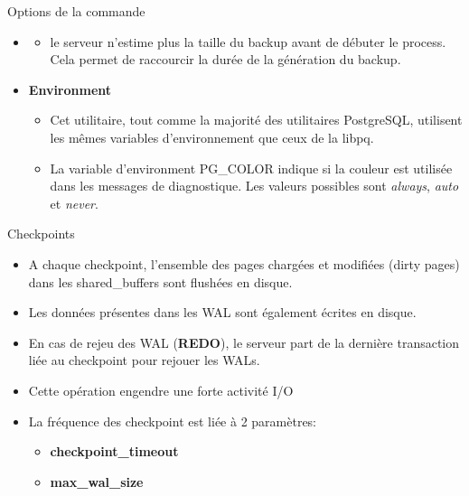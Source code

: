 \begin{frame}{Options de la commande }

\begin{itemize}
   \item {}
   \begin{itemize}
      \item le serveur n'estime plus la taille du backup avant de débuter le process. Cela permet de raccourcir la durée de la génération du backup.
   \end{itemize}

\item{\textbf{Environment}}
   \begin{itemize}
      \item Cet utilitaire, tout comme la majorité des utilitaires PostgreSQL, utilisent les mêmes variables d'environnement que ceux de la libpq.
      \item La variable d'environment PG\_COLOR indique si la couleur est utilisée dans les messages de diagnostique. Les valeurs possibles sont \textsl{always}, \textsl{auto} et \textsl{never}.
   \end{itemize}
\end{itemize}

\end{frame}


\begin{frame}{Checkpoints}
   \label{checkpoint}

\begin{itemize}
   \item A chaque checkpoint, l'ensemble des pages chargées et modifiées (\textsf{dirty pages}) dans les \textsf{shared\_buffers} sont flushées en disque.
   \item Les données présentes dans les WAL sont également écrites en disque.
   \item En cas de rejeu des WAL (\textbf{REDO}), le serveur part de la dernière transaction liée au checkpoint pour rejouer les WALs.
   \item Cette opération engendre une forte activité I/O
   \item La fréquence des checkpoint est liée à 2 paramètres:
   \begin{itemize}
      \item \textbf{checkpoint\_timeout}
      \item \textbf{max\_wal\_size}
   \end{itemize}
\end{itemize}

\begin{toile}
\end{toile}

\end{frame}

